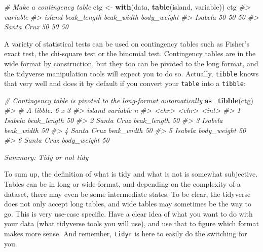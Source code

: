 \documentclass[]{book}
\newenvironment{Shaded}{}{}
\newcommand{\CommentTok}[1]{\textcolor[rgb]{0.38,0.63,0.69}{\textit{#1}}}
\newcommand{\KeywordTok}[1]{\textcolor[rgb]{0.00,0.44,0.13}{\textbf{#1}}}
\newcommand{\NormalTok}[1]{#1}
\newcommand{\StringTok}[1]{\textcolor[rgb]{0.25,0.44,0.63}{#1}}
\newenvironment{blackbox}{
  \definecolor{shadecolor}{rgb}{0.9, 0.9, 0.9}  %
  \color{black}
  \begin{shaded}}
 {\end{shaded}}
\newenvironment{infobox}[1]
  {
  \begin{itemize}
  \renewcommand{\labelitemi}{
    \raisebox{-.7\height}[0pt][0pt]{
      {\setkeys{Gin}{width=3em,keepaspectratio}
        }
    }
  }
  \setlength{\fboxsep}{1em}
  \begin{blackbox}
  \item
  }
  {
  \end{blackbox}
  \end{itemize}
  }
\begin{document}
\begin{Shaded}
\begin{Highlighting}[]
\CommentTok{# Make a contingency table}
\NormalTok{ctg <-}\StringTok{ }\KeywordTok{with}\NormalTok{(data, }\KeywordTok{table}\NormalTok{(island, variable))}
\NormalTok{ctg}
\CommentTok{#>             variable}
\CommentTok{#> island       beak_length beak_width body_weight}
\CommentTok{#>   Isabela             50         50          50}
\CommentTok{#>   Santa Cruz          50         50          50}
\end{Highlighting}
\end{Shaded}

A variety of statistical tests can be used on contingency tables such as Fisher's exact test, the chi-square test or the binomial test. Contingency tables are in the wide format by construction, but they too can be pivoted to the long format, and the tidyverse manipulation tools will expect you to do so. Actually, \texttt{tibble} knows that very well and does it by default if you convert your \texttt{table} into a \texttt{tibble}:

\begin{Shaded}
\begin{Highlighting}[]
\CommentTok{# Contingency table is pivoted to the long-format automatically}
\KeywordTok{as_tibble}\NormalTok{(ctg)}
\CommentTok{#> # A tibble: 6 x 3}
\CommentTok{#>   island     variable        n}
\CommentTok{#>   <chr>      <chr>       <int>}
\CommentTok{#> 1 Isabela    beak_length    50}
\CommentTok{#> 2 Santa Cruz beak_length    50}
\CommentTok{#> 3 Isabela    beak_width     50}
\CommentTok{#> 4 Santa Cruz beak_width     50}
\CommentTok{#> 5 Isabela    body_weight    50}
\CommentTok{#> 6 Santa Cruz body_weight    50}
\end{Highlighting}
\end{Shaded}

\begin{infobox}{summary}

\emph{Summary: Tidy or not tidy}

To sum up, the definition of what is tidy and what is not is somewhat subjective. Tables can be in long or wide format, and depending on the complexity of a dataset, there may even be some intermediate states. To be clear, the tidyverse does not only accept long tables, and wide tables may sometimes be the way to go. This is very use-case specific. Have a clear idea of what you want to do with your data (what tidyverse tools you will use), and use that to figure which format makes more sense. And remember, \texttt{tidyr} is here to easily do the switching for you.

\end{infobox}
\end{document}

